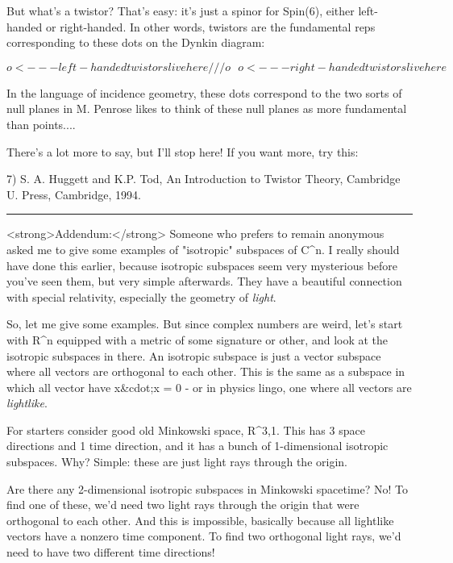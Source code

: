 But what's a twistor?  That's easy: it's just a spinor for Spin(6),
either left-handed or right-handed.  In other words, twistors are
the fundamental reps corresponding to these dots on the Dynkin
diagram:


$$

                          o <--- left-handed twistors live here
                         /
                        /
                       /
                      o
                       \
                        \
                         \
                          o <--- right-handed twistors live here
$$
    
In the language of incidence geometry, these dots correspond to the two
sorts of null planes in M.  Penrose likes to think of these null planes
as more fundamental than points....

There's a lot more to say, but I'll stop here!  If you want more,
try this:

7) S. A. Huggett and K.P. Tod, An Introduction to Twistor Theory,
Cambridge U. Press, Cambridge, 1994.

\par\noindent\rule{\textwidth}{0.4pt}
<strong>Addendum:</strong> 
Someone who prefers to remain anonymous asked me to give some examples
of "isotropic" subspaces of C^{n}.  I really should have done this
earlier, because isotropic subspaces seem very mysterious before you've
seen them, but very simple afterwards.  They have a beautiful connection
with special relativity, especially the geometry of \emph{light}.


So, let me give some examples.  But since complex numbers are weird, let's
start with R^{n} 
equipped with a metric of some signature or other, and look
at the isotropic subspaces in there.  An isotropic subspace is just a
vector subspace where all vectors are orthogonal to each other.  This
is the same as a subspace in which all vector have x&cdot;x = 0 - or in 
physics lingo, one where all vectors are \emph{lightlike}.


For starters consider good old Minkowski space, R^{3,1}.  This has 3
space directions and 1 time direction, and it has a bunch of 1-dimensional
isotropic subspaces.  Why?  Simple: these are just light rays through the 
origin.


Are there any 2-dimensional isotropic subspaces in Minkowski spacetime?
No!  To find one of these, we'd need two light rays through the origin
that were orthogonal to each other.  And this is impossible, basically
because all lightlike vectors have a nonzero time component.  To find
two orthogonal light rays, we'd need to have two different time directions!


